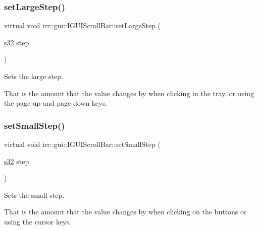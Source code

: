 \subsubsection{\texorpdfstring{set\+Large\+Step()}{setLargeStep()}\hspace{0.1cm}{\footnotesize\ttfamily [2/2]}}
{\footnotesize\ttfamily virtual void irr\+::gui\+::\+I\+G\+U\+I\+Scroll\+Bar\+::set\+Large\+Step (\begin{DoxyParamCaption}\item[{\hyperlink{namespaceirr_ac66849b7a6ed16e30ebede579f9b47c6}{s32}}]{step }\end{DoxyParamCaption})\hspace{0.3cm}{\ttfamily [pure virtual]}}



Sets the large step. 

That is the amount that the value changes by when clicking in the tray, or using the page up and page down keys. \mbox{\label{classirr_1_1gui_1_1IGUIScrollBar_aa85963aba6c9ac21a885fcab3eab3b20}} 
\subsubsection{\texorpdfstring{set\+Small\+Step()}{setSmallStep()}\hspace{0.1cm}{\footnotesize\ttfamily [1/2]}}
{\footnotesize\ttfamily virtual void irr\+::gui\+::\+I\+G\+U\+I\+Scroll\+Bar\+::set\+Small\+Step (\begin{DoxyParamCaption}\item[{\hyperlink{namespaceirr_ac66849b7a6ed16e30ebede579f9b47c6}{s32}}]{step }\end{DoxyParamCaption})\hspace{0.3cm}{\ttfamily [pure virtual]}}



Sets the small step. 

That is the amount that the value changes by when clicking on the buttons or using the cursor keys. \mbox{\label{classirr_1_1gui_1_1IGUIScrollBar_aa85963aba6c9ac21a885fcab3eab3b20}} 
